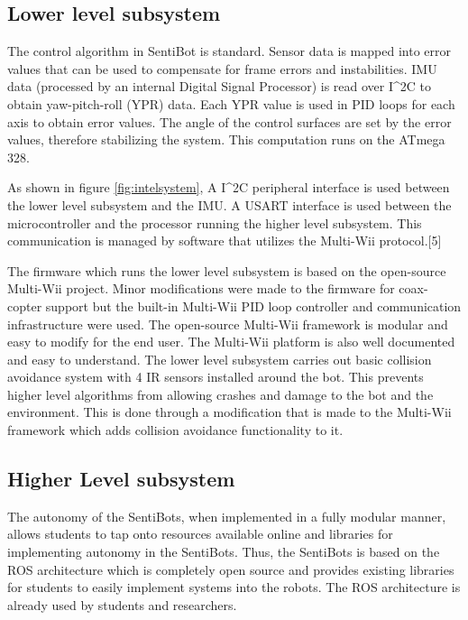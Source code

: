 \documentclass[12pt]{article}
\begin{document}
\subsection{Lower level subsystem}

The control algorithm in SentiBot is standard. Sensor data is mapped into error values that can be used to compensate for frame errors and instabilities. IMU data (processed by an internal Digital Signal Processor) is read over I^2C to obtain yaw-pitch-roll (YPR) data. Each YPR value is used in PID loops for each axis to obtain error values. The angle of the control surfaces are set by the error values, therefore stabilizing the system. This computation runs on the ATmega 328.

As shown in figure \ref{fig:intelsystem}, A I^2C peripheral interface is used between the lower level subsystem and the IMU. A USART interface is used between the microcontroller and the processor running the higher level subsystem. This communication is managed by software that utilizes the Multi-Wii protocol.[5]

The firmware which runs the lower level subsystem is based on the open-source Multi-Wii project. Minor modifications were made to the firmware for coax-copter support but the built-in Multi-Wii PID loop controller and communication infrastructure were used. The open-source Multi-Wii framework is modular and easy to modify for the end user. The Multi-Wii platform is also well documented and easy to understand. The lower level subsystem carries out basic collision avoidance system with 4 IR sensors installed around the bot. This prevents higher level algorithms from allowing crashes and damage to the bot and the environment. This is done through a modification that is made to the Multi-Wii framework which adds collision avoidance functionality to it.

\subsection{Higher Level subsystem}

The autonomy of the SentiBots, when implemented in a fully modular manner, allows students to tap onto resources available online and libraries for implementing autonomy in the SentiBots. Thus, the SentiBots is based on the ROS architecture which is completely open source and provides existing libraries for students to easily implement systems into the robots. The ROS architecture is already used by students and researchers.
\end{document}
